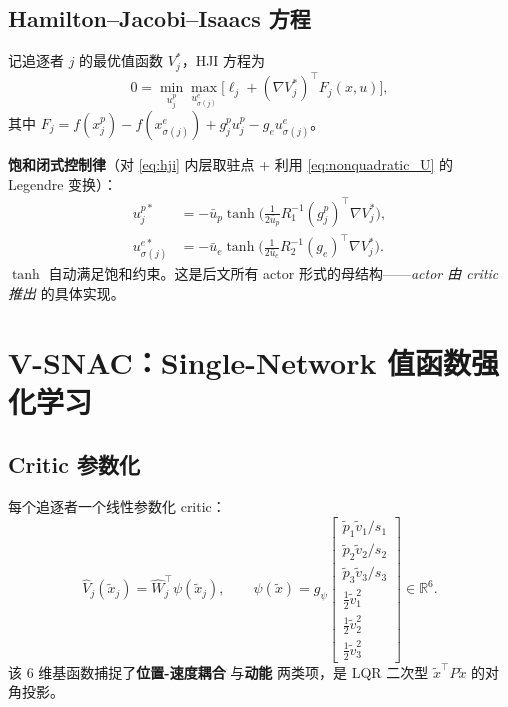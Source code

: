 \documentclass[11pt,a4paper]{article}
\newcommand{\R}{\mathbb{R}}
\newcommand{\ubar}{\bar{u}}
\theoremstyle{remark}
\begin{document}
\subsection{Hamilton--Jacobi--Isaacs 方程}

记追逐者 $j$ 的最优值函数 $V_j^*$，HJI 方程为
\begin{equation}
0=\min_{u_j^p}\max_{u_{\sigma(j)}^e}\Big[\ell_j+(\nabla V_j^*)^\top F_j(x,u)\Big],
\label{eq:hji}
\end{equation}
其中 $F_j=f(x_j^p)-f(x_{\sigma(j)}^e)+g_j^p u_j^p-g_e u_{\sigma(j)}^e$。

\textbf{饱和闭式控制律}（对 \eqref{eq:hji} 内层取驻点 + 利用 \eqref{eq:nonquadratic_U} 的 Legendre 变换）：
\begin{align}
u_j^{p*} &= -\ubar_p\tanh\!\Big(\tfrac{1}{2\ubar_p}R_1^{-1}(g_j^p)^\top\nabla V_j^*\Big),\label{eq:opt_pursuer}\\
u_{\sigma(j)}^{e*} &= -\ubar_e\tanh\!\Big(\tfrac{1}{2\ubar_e}R_2^{-1}(g_e)^\top\nabla V_j^*\Big).\label{eq:opt_evader}
\end{align}
$\tanh$ 自动满足饱和约束。这是后文所有 actor 形式的母结构——\emph{actor 由 critic 推出} 的具体实现。

\section{V-SNAC：Single-Network 值函数强化学习}\label{sec:vsnac}

\subsection{Critic 参数化}

每个追逐者一个线性参数化 critic：
\begin{equation}
\hat V_j(\tilde x_j)=\hat W_j^\top\psi(\tilde x_j),\qquad
\psi(\tilde x)=g_\psi
\begin{bmatrix}
\tilde p_1\tilde v_1/s_1\\\tilde p_2\tilde v_2/s_2\\\tilde p_3\tilde v_3/s_3\\
\tfrac12\tilde v_1^2\\\tfrac12\tilde v_2^2\\\tfrac12\tilde v_3^2
\end{bmatrix}\in\R^6.
\label{eq:vsnac_critic}
\end{equation}
该 6 维基函数捕捉了\textbf{位置-速度耦合} 与\textbf{动能} 两类项，是 LQR 二次型 $\tilde x^\top P\tilde x$ 的对角投影。
\end{document}

